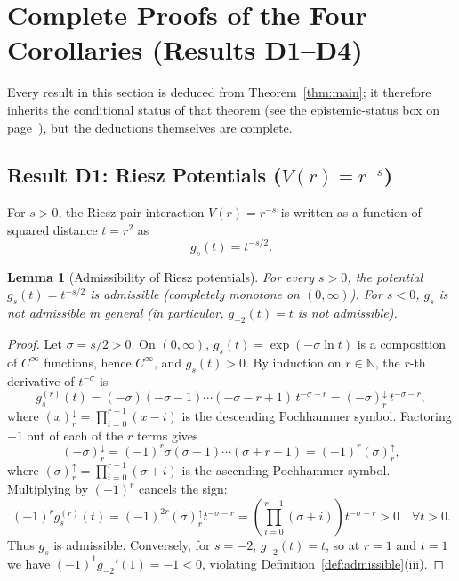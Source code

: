 \documentclass[11pt, a4paper]{article}
\newtheorem{lemma}[theorem]{Lemma}
\theoremstyle{definition}
\theoremstyle{remark}
\newcommand{\N}{\mathbb{N}}
\begin{document}
\section{Complete Proofs of the Four Corollaries (Results D1--D4)}
\label{sec:corollaries}

Every result in this section is deduced from Theorem~\ref{thm:main}; it therefore inherits the conditional status of that theorem (see the epistemic-status box on page~\pageref{box:status}), but the deductions themselves are complete.

\subsection{Result D1: Riesz Potentials ($V(r) = r^{-s}$)}

For $s > 0$, the Riesz pair interaction $V(r) = r^{-s}$ is written as a function of squared distance $t = r^2$ as
\[
g_s(t) = t^{-s/2}.
\]

\begin{lemma}[Admissibility of Riesz potentials]
\label{lem:riesz_adm}
For every $s > 0$, the potential $g_s(t) = t^{-s/2}$ is admissible (completely monotone on $(0, \infty)$). For $s < 0$, $g_s$ is not admissible in general (in particular, $g_{-2}(t) = t$ is not admissible).
\end{lemma}

\begin{proof}
Let $\sigma = s/2 > 0$. On $(0, \infty)$, $g_s(t) = \exp(-\sigma \ln t)$ is a composition of $C^\infty$ functions, hence $C^\infty$, and $g_s(t) > 0$. By induction on $r \in \N$, the $r$-th derivative of $t^{-\sigma}$ is
\[
g_s^{(r)}(t) = (-\sigma)(-\sigma - 1)\cdots(-\sigma - r + 1) \, t^{-\sigma - r} = (-\sigma)_r^{\downarrow} \, t^{-\sigma - r},
\]
where $(x)_r^{\downarrow} = \prod_{i=0}^{r-1} (x - i)$ is the descending Pochhammer symbol. Factoring $-1$ out of each of the $r$ terms gives
\[
(-\sigma)_r^{\downarrow} = (-1)^r \sigma(\sigma + 1)\cdots(\sigma + r - 1) = (-1)^r (\sigma)_r^{\uparrow},
\]
where $(\sigma)_r^{\uparrow} = \prod_{i=0}^{r-1} (\sigma + i)$ is the ascending Pochhammer symbol. Multiplying by $(-1)^r$ cancels the sign:
\[
(-1)^r g_s^{(r)}(t) = (-1)^{2r} (\sigma)_r^{\uparrow} t^{-\sigma - r} = \left(\prod_{i=0}^{r-1} (\sigma + i)\right) t^{-\sigma - r} > 0 \quad \forall t > 0.
\]
Thus $g_s$ is admissible. Conversely, for $s = -2$, $g_{-2}(t) = t$, so at $r = 1$ and $t = 1$ we have $(-1)^1 g_{-2}'(1) = -1 < 0$, violating Definition~\ref{def:admissible}(iii).
\end{proof}
\end{document}
